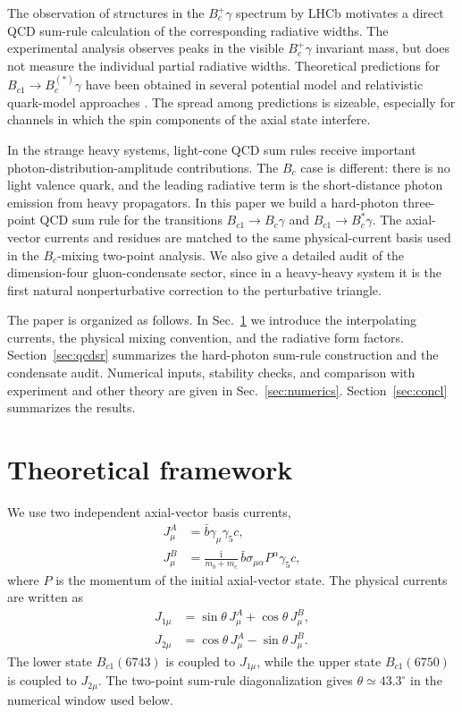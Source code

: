 \documentclass[aps,prd,preprint,nofootinbib,superscriptaddress]{revtex4-2}
\newcommand{\ii}{\mathrm{i}}
\newcommand{\Bc}{B_c}
\newcommand{\Bcst}{B_c^\ast}
\newcommand{\Bcone}{B_{c1}}
\begin{document}
The observation of structures in the \(B_c^+\gamma\) spectrum by LHCb
\cite{LHCbBc1PObservation2025,LHCbBc1PStudy2025} motivates a direct QCD
sum-rule calculation of the corresponding radiative widths.  The experimental
analysis observes peaks in the visible \(B_c^+\gamma\) invariant mass, but does
not measure the individual partial radiative widths.  Theoretical predictions
for \(B_{c1}\to B_c^{(\ast)}\gamma\) have been obtained in several potential
model and relativistic quark-model approaches
\cite{Godfrey2004,Ebert2003,Fulcher1999,Gershtein1995,LiTang2023,
LiZhong2019,LiLiu2023,EichtenQuigg2018,BondarMilstein2025}.  The spread among
predictions is sizeable, especially for channels in which the spin components
of the axial state interfere.

In the strange heavy systems, light-cone QCD sum rules receive important
photon-distribution-amplitude contributions.  The \(B_c\) case is different:
there is no light valence quark, and the leading radiative term is the
short-distance photon emission from heavy propagators.  In this paper we build
a hard-photon three-point QCD sum rule for the transitions
\(\Bcone\to \Bc\gamma\) and \(\Bcone\to \Bcst\gamma\).  The axial-vector
currents and residues are matched to the same physical-current basis used in
the \(B_c\)-mixing two-point analysis.  We also give a detailed audit of the
dimension-four gluon-condensate sector, since in a heavy-heavy system it is the
first natural nonperturbative correction to the perturbative triangle.

The paper is organized as follows.  In Sec.~\ref{sec:framework} we introduce
the interpolating currents, the physical mixing convention, and the radiative
form factors.  Section~\ref{sec:qcdsr} summarizes the hard-photon sum-rule
construction and the condensate audit.  Numerical inputs, stability checks,
and comparison with experiment and other theory are given in
Sec.~\ref{sec:numerics}.  Section~\ref{sec:concl} summarizes the results.

\section{Theoretical framework}
\label{sec:framework}

We use two independent axial-vector basis currents,
\begin{align}
  J^A_\mu &= \bar b \gamma_\mu\gamma_5 c,\\
  J^B_\mu &= \frac{\ii}{m_b+m_c}\,
  \bar b\sigma_{\mu\alpha}P^\alpha\gamma_5 c ,
  \label{eq:basis-currents}
\end{align}
where \(P\) is the momentum of the initial axial-vector state.  The physical
currents are written as
\begin{align}
  J_{1\mu} &= \sin\theta\,J^A_\mu+\cos\theta\,J^B_\mu,\\
  J_{2\mu} &= \cos\theta\,J^A_\mu-\sin\theta\,J^B_\mu .
  \label{eq:physical-currents}
\end{align}
The lower state \(\Bcone(6743)\) is coupled to \(J_{1\mu}\), while the upper
state \(\Bcone(6750)\) is coupled to \(J_{2\mu}\).  The two-point sum-rule
diagonalization gives \(\theta\simeq43.3^\circ\) in the numerical window used
below.
\end{document}
